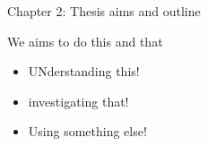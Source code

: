 Chapter 2: Thesis aims and outline

We aims to do this and that

\begin{itemize}
\item UNderstanding this!
\item investigating that!
\item Using something else!
\end{itemize}


